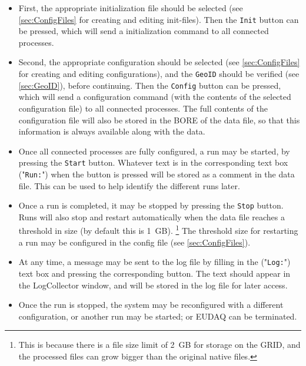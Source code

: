 \begin{itemize}
\item First, the appropriate initialization file should be selected (see \autoref{sec:ConfigFiles} for creating and editing init-files). Then the \texttt{Init} button can be pressed,
which will send a initialization command to all connected processes.

\item Second, the appropriate configuration should be selected 
(see \autoref{sec:ConfigFiles} for creating and editing configurations),
and the \texttt{GeoID} should be verified (see \autoref{sec:GeoID}), before continuing.
Then the \texttt{Config} button can be pressed,
which will send a configuration command
(with the contents of the selected configuration file) to all connected processes.
The full contents of the configuration file will also be stored
in the \gls{BORE} of the data file,
so that this information is always available along with the data.
\item Once all connected processes are fully configured, a run may be started, by pressing the \texttt{Start} button.
Whatever text is in the corresponding text box ("\texttt{Run:}") when the button is pressed
will be stored as a comment in the data file.
This can be used to help identify the different runs later.
\item Once a run is completed, it may be stopped by pressing the \texttt{Stop} button.
Runs will also stop and restart automatically when the data file reaches a threshold in size (by default this is 1~GB).%
\footnote{This is because there is a file size limit of 2~GB for storage on the GRID,
and the processed files can grow bigger than the original native files.}
The threshold size for restarting a run may be configured in the config file (see \autoref{sec:ConfigFiles}).
\item At any time, a message may be sent to the log file by filling in the ("\texttt{Log:}") text box and pressing the corresponding button.
The text should appear in the LogCollector window, and will be stored in the log file for later access.
\item Once the run is stopped, the system may be reconfigured with a different configuration, or another run may be started; or EUDAQ can be terminated.
  
\end{itemize}
